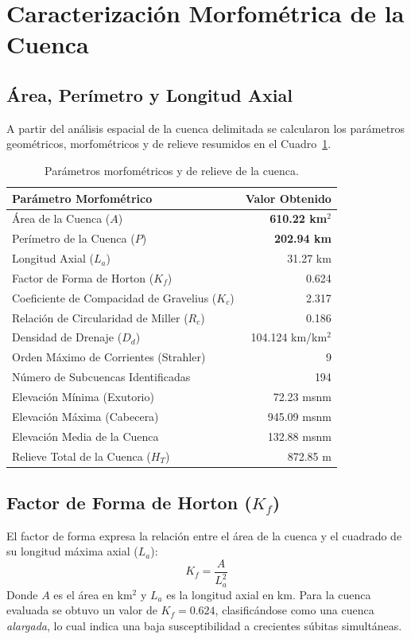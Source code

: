 \documentclass[11pt,a4paper]{article}
\begin{document}
\section{Caracterización Morfométrica de la Cuenca}

\subsection{Área, Perímetro y Longitud Axial}
A partir del análisis espacial de la cuenca delimitada se calcularon los parámetros geométricos, morfométricos y de relieve resumidos en el Cuadro~\ref{tab:morfometria}.

\begin{table}[H]
\centering
\caption{Parámetros morfométricos y de relieve de la cuenca.}
\label{tab:morfometria}
\begin{tabular}{p{8.5cm}r}\toprule
\textbf{Parámetro Morfométrico} & \textbf{Valor Obtenido} \\\midrule
Área de la Cuenca ($A$) & \textbf{610.22 km$^2$} \\
Perímetro de la Cuenca ($P$) & \textbf{202.94 km} \\
Longitud Axial ($L_a$) & 31.27 km \\
Factor de Forma de Horton ($K_f$) & 0.624 \\
Coeficiente de Compacidad de Gravelius ($K_c$) & 2.317 \\
Relación de Circularidad de Miller ($R_c$) & 0.186 \\
Densidad de Drenaje ($D_d$) & 104.124 km/km$^2$ \\
Orden Máximo de Corrientes (Strahler) & 9 \\
Número de Subcuencas Identificadas & 194 \\
Elevación Mínima (Exutorio) & 72.23 msnm \\
Elevación Máxima (Cabecera) & 945.09 msnm \\
Elevación Media de la Cuenca & 132.88 msnm \\
Relieve Total de la Cuenca ($H_T$) & 872.85 m \\
\bottomrule
\end{tabular}
\end{table}

\subsection{Factor de Forma de Horton ($K_f$)}
El factor de forma expresa la relación entre el área de la cuenca y el cuadrado de su longitud máxima axial ($L_a$):
\begin{equation}
K_f = \frac{A}{L_a^2}
\end{equation}
Donde $A$ es el área en km$^2$ y $L_a$ es la longitud axial en km. Para la cuenca evaluada se obtuvo un valor de $K_f = 0.624$, clasificándose como una cuenca \textit{alargada}, lo cual indica una baja susceptibilidad a crecientes súbitas simultáneas.
\end{document}
